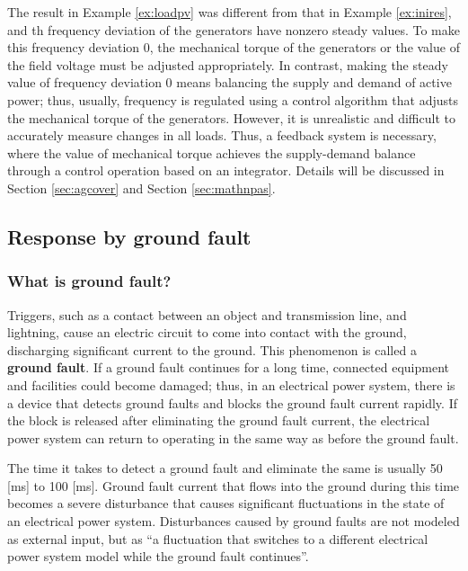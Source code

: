 \documentclass[tombow,dvipdfmx]{corona-a5-1.1}
\begin{document}
The result in Example \ref{ex:loadpv} was different from that in Example \ref{ex:inires}, and th frequency deviation of the generators have nonzero steady values.
To make this frequency deviation 0, the mechanical torque of the generators or the value of the field voltage must be adjusted appropriately.
In contrast, making the steady value of frequency deviation 0 means balancing the supply and demand of active power; thus, usually, frequency is regulated using a control algorithm that adjusts the mechanical torque of the generators.
However, it is unrealistic and difficult to accurately measure changes in all loads. Thus, a feedback system is necessary, where the value of mechanical torque achieves the supply-demand balance through a control operation based on an integrator.
Details will be discussed in Section \ref{sec:agcover} and Section \ref{sec:mathnpas}.

\subsection{Response by ground fault}\label{sec:fault}

\smallskip
\subsubsection{What is ground fault?}

Triggers, such as a contact between an object and transmission line, and lightning, cause an electric circuit to come into contact with the ground, discharging significant current to the ground.
This phenomenon is called a \textbf{ground fault}. If a ground fault continues for a long time, connected equipment and facilities could become damaged; thus, in an electrical power system, there is a device that detects ground faults and blocks the ground fault current rapidly.
If the block is released after eliminating the ground fault current, the electrical power system can return to operating in the same way as before the ground fault.

The time it takes to detect a ground fault and eliminate the same is usually 50 [ms] to 100 [ms].
Ground fault current that flows into the ground during this time becomes a severe disturbance that causes significant fluctuations in the state of an electrical power system.
Disturbances caused by ground faults are not modeled as external input, but as “a fluctuation that switches to a different electrical power system model while the ground fault continues”.
\end{document}
